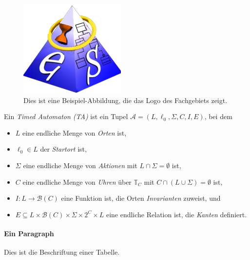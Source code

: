 \begin{figure}
    \centering
    \includegraphics[width=.3\linewidth]{figures/es_logo_gross.jpg}
    \caption{Dies ist eine Beispiel-Abbildung, die das Logo des Fachgebiets zeigt.}\label{fig:some-figure}
\end{figure}


\begin{definition}\label{def:dummy-def}
Ein \emph{Timed Automaton (TA)} ist ein Tupel $\mathcal{A}=(L,\ell_0,\Sigma,C,I,E)$, bei dem
\begin{itemize}
	\item $L$ eine endliche Menge von \emph{Orten} ist,
	\item $\ell_0\in L$ der \emph{Startort} ist,
	\item $\Sigma$ eine endliche Menge von \emph{Aktionen} mit $L\cap\Sigma=\emptyset$ ist,
	\item $C$ eine endliche Menge von \emph{Uhren} über $\mathbb{T}_C$ mit $C\cap(L\cup\Sigma)=\emptyset$ ist,
	\item $I:L\rightarrow\mathcal{B}(C)$ eine Funktion ist, die Orten \emph{Invarianten} zuweist, und
	\item $E\subseteq L\times\mathcal{B}(C)\times\Sigma\times 2^{C}\times L$ eine endliche Relation ist, die \emph{Kanten} definiert.
\end{itemize}
\end{definition}


\paragraph{Ein Paragraph}
\lipsum[9]

\begin{example}\label{example:dummy-example}
\lipsum[5-6]
\end{example}

\begin{table}[tp]
    \centering
    \caption{Dies ist die Beschriftung einer Tabelle.}\label{table:some-table}
    
\end{table}

